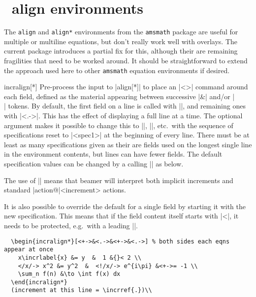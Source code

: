 \documentclass[a4paper]{ltxdoc}
\begin{document}
\section{\AmSTeX\ align environments}

The \texttt{align} and \texttt{align*} environments from the \texttt{amsmath}
package are useful for multiple or multiline equations, but don't really work
well with overlays.  The current package introduces a partial fix for this,
although their are remaining fragilities that need to be worked around.  It
should be straightforward to extend the approach used here to other
\texttt{amsmath} equation environments if desired.


\begin{environment}{{incralign[*]}}
    Pre-process the input to |align[*]| to place an |\action<>{}| command
    around each field, defined as the material appearing between successive |&|
    and/or |\\| tokens.  By default, the first field on a line is called with
    |\action<+->{}|, and remaining ones with ||.  This has the
    effect of displaying a full line at a time.  The optional argument makes it
    possible to change this to ||, ||, etc.\ with
    the sequence of specifications reset to |<spec1>| at the beginning of every
    line. There must be at least as many specifications given as their are
    fields used on the longest single line in the environment contents, but
    lines can have fewer fields.  The default specification values can be
    changed by a calling |\incraligndefaultspec| as below.

    The use of |\action| means that beamer will interpret both implicit
    increments and standard |action@|\meta<increment> actions.

    It is also possible to override the default for a single field by starting
    it with the new specification.  This means that if the field content itself
    starts with |<|, it needs to be protected, e.g.\ with a leading |{}|.

    \example
\begin{verbatim}
  \begin{incralign*}[<+->&<.->&<+->&<.->] % both sides each eqns appear at once
    x\incrlabel{x} &= y  &  1 &{}< 2 \\
    </x/-> x^2 &= y^2  &  <!/x/-> e^{i\pi} &<+->= -1 \\
    \sum_n f(n) &\to \int f(x) dx
  \end{incralign*}
  (increment at this line = \incrref{.})\\
\end{verbatim}
    

\end{environment}
\end{document}
